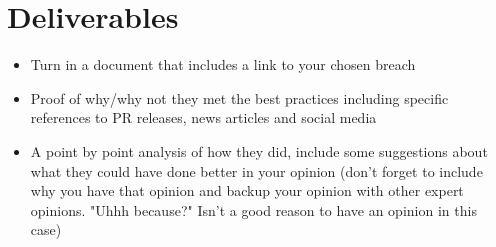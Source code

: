 \documentclass[12pt]{article}
\begin{document}
\section*{Deliverables}
\begin{itemize}
    \item Turn in a document that includes a link to your chosen breach
    \item Proof of why/why not they met the best practices including specific references to PR releases, news articles and social media
    \item  A point by point analysis of how they did, include some suggestions about what they could have done better in your opinion (don't forget to include why you have that opinion and backup your opinion with other expert opinions. "Uhhh because?"  Isn't a good reason to have an opinion in this case)
\end{itemize}
\end{document}
